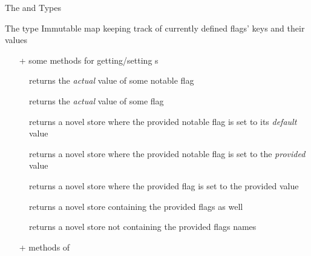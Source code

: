 \documentclass[handout]{beamer}
\begin{document}
\begin{frame}[allowframebreaks]{The  and  Types}
    \framebreak

    \begin{block}{The  type}
        Immutable map keeping track of currently defined \alert{flags}' keys and their \alert{values}
        \begin{itemize}
            \item[+] some methods for getting/setting s
        \end{itemize}
    \end{block}
    \begin{description}
        \item[] returns the \emph{actual} value of some \alert{notable} flag
        \item[] returns the \emph{actual} value of some flag
        \item[] returns a novel store where the provided \alert{notable} flag is set to its \emph{default} value
        \item[] returns a novel store where the provided \alert{notable} flag is set to the \emph{provided} value
        \item[] returns a novel store where the provided flag is set to the provided value
        \item[] returns a novel store containing the provided flags as well
        \item[] returns a novel store not containing the provided flags names
    \end{description}
    \begin{itemize}
        \item[+] methods of 
    \end{itemize}
\end{frame}
\end{document}
